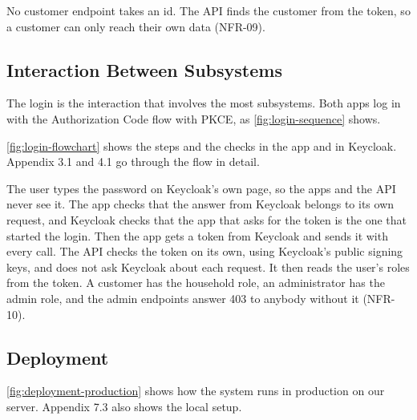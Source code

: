 No customer endpoint takes an id. The API finds the customer from the token, so a
customer can only reach their own data (NFR-09).

\subsection{Interaction Between Subsystems}\label{sec:arch-login}

The login is the interaction that involves the most subsystems. Both apps log in with
the Authorization Code flow with PKCE, as \autoref{fig:login-sequence} shows.


\autoref{fig:login-flowchart} shows the steps and the checks in the app and in
Keycloak. Appendix 3.1 and 4.1 go through the flow in detail.


The user types the password on Keycloak's own page, so the apps and the API never see
it. The app checks that the answer from Keycloak belongs to its own request, and
Keycloak checks that the app that asks for the token is the one that started the login.
Then the app gets a token from Keycloak and sends it with every call. The API checks the
token on its own, using Keycloak's public signing keys, and does not ask Keycloak about
each request. It then reads the user's roles from the token. A customer has the
household role, an administrator has the admin role, and the admin endpoints answer 403
to anybody without it (NFR-10).

\subsection{Deployment}\label{sec:arch-deployment}

\autoref{fig:deployment-production} shows how the system runs in production on our
server. Appendix 7.3 also shows the local setup.



